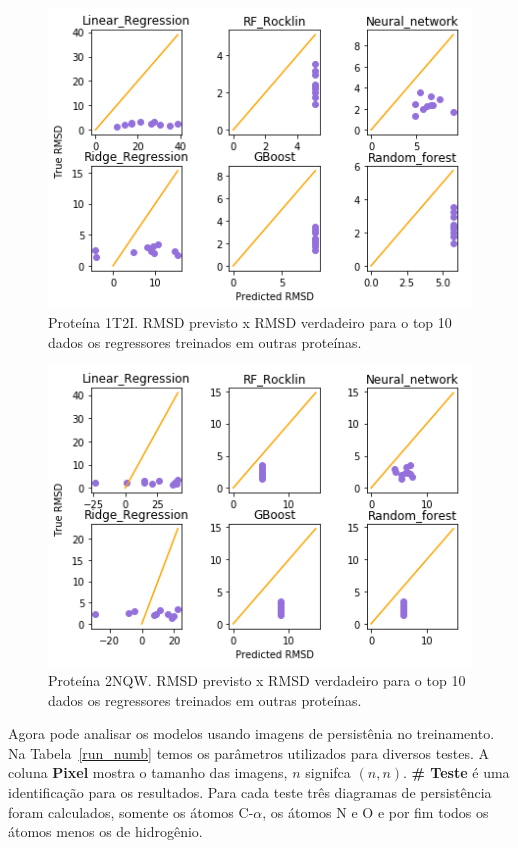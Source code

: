 \begin{figure}[!htbp]
    \centering
    \includegraphics[width=.7\linewidth]{images/relatorio/res1t2i.png}
    \caption{Proteína 1T2I. RMSD previsto x RMSD verdadeiro para o top 10 dados os 
             regressores treinados em outras proteínas.}
    \label{fig:res1t2i}
\end{figure}

\begin{figure}[!htbp]
    \centering
    \includegraphics[width=.7\linewidth]{images/relatorio/res2nqw.png}
    \caption{Proteína 2NQW. RMSD previsto x RMSD verdadeiro para o top 10 dados os 
             regressores treinados em outras proteínas.}
    \label{fig:res2nqw}
\end{figure}

Agora pode analisar os modelos usando imagens de persistênia no treinamento. Na Tabela~\ref{run_numb} temos
os parâmetros utilizados para diversos testes. A coluna \textbf{Pixel} mostra o tamanho das imagens, $n$
signifca $(n,n)$. \textbf{\# Teste} é uma identificação para os resultados. Para cada teste três diagramas
de persistência foram calculados, somente os átomos C-$\alpha$, os átomos N e O e por fim todos os átomos
menos os de hidrogênio.

